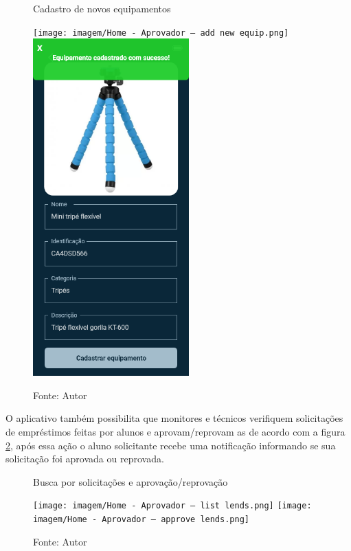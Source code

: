     \clearpage
    
    \begin{figure}[tb]
    \begin{center}
    \caption{Cadastro de novos equipamentos}
    \texttt{[image: imagem/Home - Aprovador – add new equip.png]} \quad
    \includegraphics[width=6cm]{imagem/Home - Aprovador – add new equip – 1.png}
    \caption*{Fonte: Autor}
    \label{figure:aprovador-equip}
    \end{center}
    \end{figure}
    
    O aplicativo também possibilita que monitores e técnicos verifiquem solicitações de empréstimos feitas por alunos e aprovam/reprovam as de acordo com a figura \ref{figure:aprovador-solic}, após essa ação o aluno solicitante recebe uma notificação informando se sua solicitação foi aprovada ou reprovada.
    
    \clearpage
    
    \begin{figure}[tb]
    \begin{center}
    \caption{Busca por solicitações e aprovação/reprovação}
    \texttt{[image: imagem/Home - Aprovador – list lends.png]} \quad
    \texttt{[image: imagem/Home - Aprovador – approve lends.png]}
    \caption*{Fonte: Autor}
    \label{figure:aprovador-solic}
    \end{center}
    \end{figure}

    
    